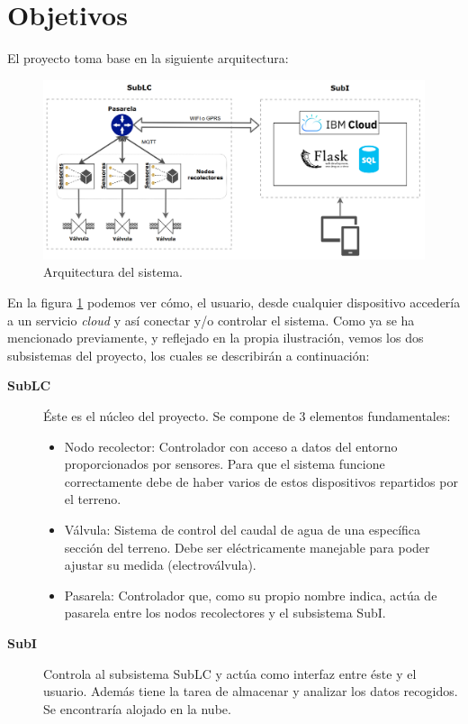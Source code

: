 
\newpage
\section{Objetivos}
\label{sec:target}

\justifying \setlength{\parindent}{1.27cm}
\normalsize\mdseries

El proyecto toma base en la siguiente arquitectura:

\begin{figure}[h]
    \centering
    \includegraphics[width=\textwidth]{figures/diagrams/architecture2.png}
    \caption{Arquitectura del sistema.}
    \label{fig:architecture}
\end{figure}

En la figura \ref{fig:architecture} podemos ver cómo, el usuario, desde cualquier dispositivo accedería a un servicio \textit{cloud} y así conectar y/o controlar el sistema. Como ya se ha mencionado previamente, y reflejado en la propia ilustración, vemos los dos subsistemas del proyecto, los cuales se describirán a continuación:

\begin{description}
    \item [\textbf{SubLC}] Éste es el núcleo del proyecto. Se compone de 3 elementos fundamentales:
    \begin{itemize}
        \item Nodo recolector: Controlador con acceso a datos del entorno proporcionados por sensores. Para que el sistema funcione correctamente debe de haber varios de estos dispositivos repartidos por el terreno.
        \item Válvula: Sistema de control del caudal de agua de una específica sección del terreno. Debe ser eléctricamente manejable para poder ajustar su medida (electroválvula).
        \item Pasarela: Controlador que, como su propio nombre indica, actúa de pasarela entre los nodos recolectores y el subsistema SubI.
    \end{itemize}
    \item [\textbf{SubI}] Controla al subsistema SubLC y actúa como interfaz entre éste y el usuario. Además tiene la tarea de almacenar y analizar los datos recogidos. Se encontraría alojado en la nube.
\end{description}